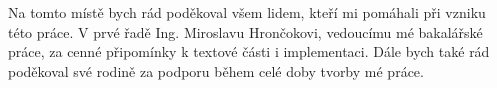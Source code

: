 Na tomto místě bych rád poděkoval všem lidem, kteří mi pomáhali při vzniku této práce. V prvé řadě Ing. Miroslavu Hrončokovi, vedoucímu mé bakalářské práce, za cenné připomínky k textové části i implementaci. Dále bych také rád poděkoval své rodině za podporu během celé doby tvorby mé práce.